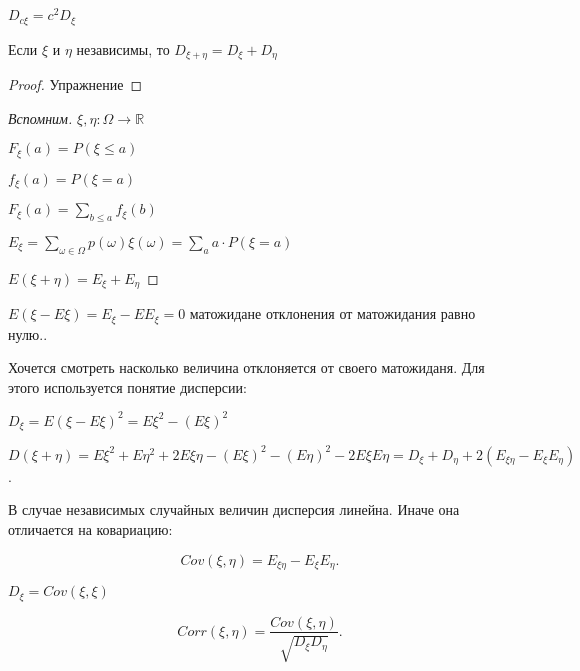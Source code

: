 \documentclass{book}
\newcommand\R{\ensuremath{\mathbb{R}}}
\theoremstyle{definition}
\begin{document}
\begin{theorem}
    $D_{c\xi} = c^2D_{\xi}$

    Если $\xi$ и  $\eta$ независимы, то $D_{\xi + \eta} = D_{\xi} + D_{\eta}$
\end{theorem}
\begin{proof}
    Упражнение
\end{proof}


\begin{proof}
    [Вспомним]

    $\xi, \eta : \Omega \to  \R$

    $F_{\xi}(a) = P\left( \xi \leqslant  a \right) $

    $f_{\xi}(a) = P\left( \xi = a \right) $

    $F_{\xi}(a) = \sum_{b\leqslant a} f_{\xi}(b)$

    $E_{\xi} = \sum_{\omega\in \Omega}p(\omega)\xi(\omega)  = \sum_a a\cdot P\left( \xi = a \right) $

    $E(\xi+\eta) = E_{\xi} + E_{\eta}$
\end{proof}

$E\left( \xi - E\xi \right)  = E_{\xi} - EE_{\xi} = 0$ матожидане отклонения от матожидания равно нулю..

Хочется смотреть насколько величина отклоняется от своего матожиданя. Для этого используется понятие дисперсии:

$D_{\xi} = E\left( \xi-E\xi \right)^2 = E\xi^2 - \left( E\xi \right) ^2 $

$D\left( \xi+\eta \right)  = E\xi^2 + E\eta^2 + 2E\xi\eta - \left( E\xi \right) ^2 - \left( E\eta \right) ^2 - 2E\xi E\eta = D_{\xi} + D_{\eta} + 2\left( E_{\xi\eta} - E_{\xi}E_{\eta} \right) $. 

В случае независимых случайных величин дисперсия линейна. Иначе она отличается на ковариацию:

\begin{definition}
    [Ковариация]

     \[
     Cov\left( \xi, \eta \right)  = E_{\xi\eta} - E_{\xi}E_{\eta}
    .\]
    
    $D_{\xi} = Cov\left( \xi, \xi \right) $ 
\end{definition}

\begin{definition}
    [Корреляция]

    \[
        Corr\left( \xi, \eta \right)  = \frac{Cov\left( \xi, \eta \right) }{\sqrt{D_{\xi}D_{\eta}} } 
    .\] 
\end{definition}
\end{document}
